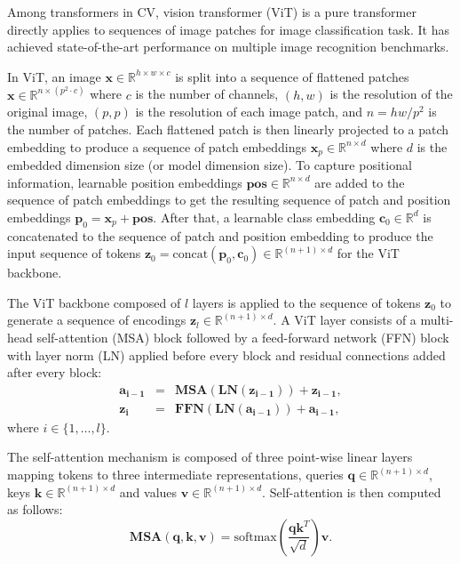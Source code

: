 \documentclass[anon,12pt]{colt2024} %
\begin{document}
Among transformers in CV, vision transformer (ViT) is a pure transformer directly applies to sequences of image patches for image classification task.
It has achieved state-of-the-art performance on multiple image recognition benchmarks.

In ViT, an image $\mathbf{x} \in \mathbb{R} ^ {h \times w \times c}$ is split into a sequence of flattened patches $\mathbf{x} \in \mathbb{R} ^ {n \times (p^2 \cdot c)}$ where $c$ is the number of channels, $(h,w)$ is the resolution of the original image, $(p,p)$ is the resolution of each image patch, and $n=hw/p^2$ is the number of patches.
Each flattened patch is then linearly projected to a patch embedding to produce a sequence of patch embeddings $\mathbf{x}_p \in \mathbb{R} ^ {n \times d}$ where $d$ is the embedded dimension size (or model dimension size).
To capture positional information, learnable position embeddings $\mathbf{pos} \in \mathbb{R} ^ {n \times d}$ are added to the sequence of patch embeddings to get the resulting sequence of patch and position embeddings $\mathbf{p}_0 = \mathbf{x}_p + \mathbf{pos}$.
After that, a learnable class embedding $\mathbf{c}_0 \in \mathbb{R}^d$ is concatenated to the sequence of patch and position embedding to produce the input sequence of tokens $\mathbf{z}_0 = \mathrm{concat}(\mathbf{p}_0,  \mathbf{c}_0) \in \mathbb{R} ^ {(n+1) \times d}$ for the ViT backbone.

The ViT backbone composed of $l$ layers is applied to the sequence of tokens $\mathbf{z}_0$ to generate a sequence of encodings $\mathbf{z}_l \in \mathbb{R} ^ {(n+1) \times d}$.
A ViT layer consists of a multi-head self-attention (MSA) block followed by a feed-forward network (FFN) block with layer norm (LN) applied before every block and residual connections added after every block:
\begin{eqnarray}
  \mathbf{a_{i-1}} &=& \mathbf{MSA}(\mathbf{LN}(\mathbf{z_{i-1}})) + \mathbf{z_{i-1}} , \\
  \mathbf{z_{i}} &=& \mathbf{FFN}(\mathbf{LN}(\mathbf{a_{i-1}})) + \mathbf{a_{i-1}},
\end{eqnarray}
where $i \in \{1,\ldots,l\}$.

The self-attention mechanism is composed of three point-wise linear layers mapping tokens to three intermediate representations, queries $\mathbf{q} \in \mathbb{R}^{(n+1) \times d}$, keys $\mathbf{k} \in \mathbb{R}^{(n+1) \times d}$ and values $\mathbf{v} \in \mathbb{R}^{(n+1) \times d}$.
Self-attention is then computed as follows:
\begin{equation}
   \mathbf{MSA}(\mathbf{q}, \mathbf{k}, \mathbf{v}) = \mathrm{softmax} \left( \frac{\mathbf{q}\mathbf{k}^T}{\sqrt{d}} \right)  \mathbf{v}.
\end{equation}
\end{document}
